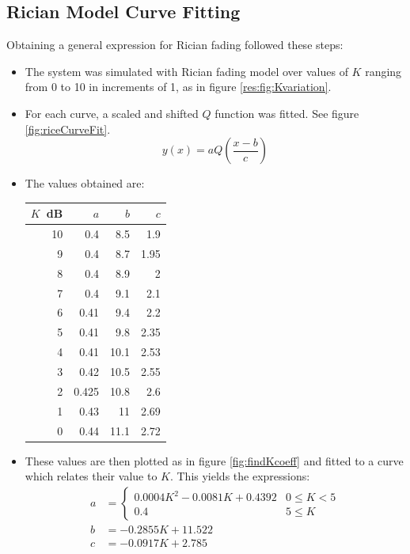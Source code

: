 \subsection{Rician Model Curve Fitting}
Obtaining a general expression for Rician fading followed these steps:
\begin{itemize}
	\item The system was simulated with Rician fading model over values of \(K\) ranging from 0 to 10 in increments of 1, as in figure \ref{res:fig:Kvariation}.
	\item For each curve, a scaled and shifted \(Q\) function was fitted. See figure \ref{fig:riceCurveFit}.
		\begin{equation}
			y(x) = aQ\left(\frac{x - b}{c}\right)
		\end{equation}
		\begin{mathDef}
		\end{mathDef}
	\item The values obtained are:
		\begin{center}
			\begin{tabular}{r r r r}
				\(K\)~dB & \(a\) & \(b\) & \(c\) \\
				\hline
				10 & 0.4 & 8.5 & 1.9 \\
				9 & 0.4 & 8.7 & 1.95 \\
				8 & 0.4 & 8.9 & 2 \\
				7 & 0.4 & 9.1 & 2.1 \\
				6 & 0.41 & 9.4 & 2.2 \\
				5 & 0.41 & 9.8 & 2.35 \\
				4 & 0.41 & 10.1 & 2.53 \\
				3 & 0.42 & 10.5 & 2.55 \\
				2 & 0.425 & 10.8 & 2.6 \\
				1 & 0.43 & 11 & 2.69 \\
				0 & 0.44 & 11.1 & 2.72
			\end{tabular}
		\end{center}
	\item These values are then plotted as in figure \ref{fig:findKcoeff} and fitted to a curve which relates their value to \(K\). This yields the expressions:
		\begin{align}
			a &= \begin{cases}0.0004K^2 - 0.0081K + 0.4392 & 0 \leq K < 5\\0.4 & 5 \leq K\end{cases}\label{eq:meth:a}\\
			b &= -0.2855K + 11.522\label{eq:meth:b}\\
			c &= -0.0917K + 2.785 \label{eq:meth:c}
		\end{align}
\end{itemize}
